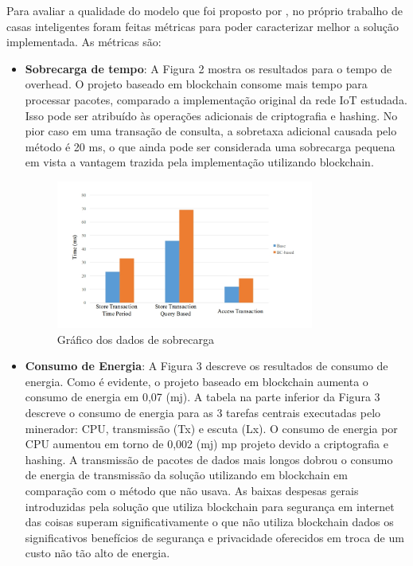 Para avaliar a qualidade do modelo que foi proposto por \cite{dorri2017blockchain}, no próprio trabalho de casas inteligentes foram feitas métricas para poder caracterizar melhor a solução implementada. As métricas são:

\begin{itemize}
    \item[] \textbf{Sobrecarga de tempo}: A Figura 2 mostra os resultados para o tempo de overhead. O projeto baseado em blockchain consome mais tempo para processar pacotes, comparado a implementação original da rede IoT estudada. Isso pode ser atribuído às operações adicionais de criptografia e hashing. No pior caso em uma transação de consulta, a sobretaxa adicional causada pelo método é 20 ms, o que ainda pode ser considerada uma sobrecarga pequena em vista a vantagem trazida pela implementação utilizando blockchain.
    \begin{figure}[H]
        \centering
        \includegraphics[width=0.8\textwidth]{pictures/results1.jpg}
        \caption{Gráfico dos dados de sobrecarga}
        \label{fig:results1}
    \end{figure}{}
    
    \item[] \textbf{Consumo de Energia}: A Figura 3 descreve os resultados de consumo de energia. Como é evidente, o projeto baseado em blockchain aumenta o consumo de energia em 0,07 (mj). A tabela na parte inferior da Figura 3 descreve o consumo de energia para as 3 tarefas centrais executadas pelo minerador: CPU, transmissão (Tx) e escuta (Lx). O consumo de energia por CPU aumentou em torno de 0,002 (mj) mp projeto devido a criptografia e hashing. A transmissão de pacotes de dados mais longos dobrou o consumo de energia de transmissão da solução utilizando em blockchain em comparação com o método que não usava. As baixas despesas gerais introduzidas pela solução que utiliza blockchain para segurança em internet das coisas superam significativamente o que não utiliza blockchain dados os significativos benefícios de segurança e privacidade oferecidos em troca de um custo não tão alto de energia.
    

\end{itemize}

